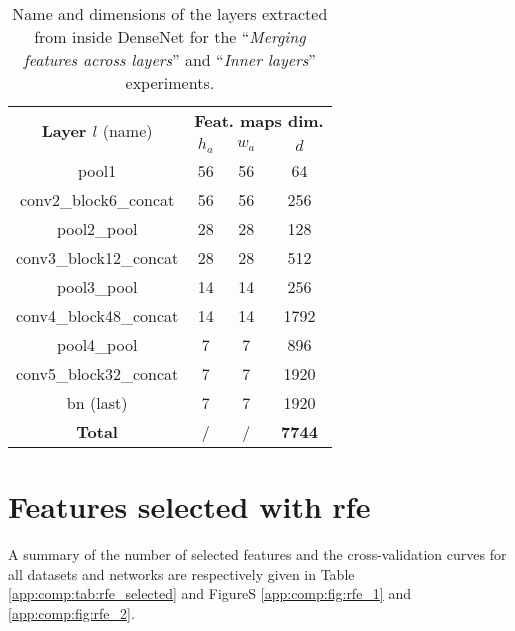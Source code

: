 \begin{table}
\centering
\begin{tabular}{|c|ccc|}
\hline
\multirow{2}{*}{\textbf{Layer $l$} (name)} & \multicolumn{3}{c|}{\textbf{Feat. maps dim.}}\\
& $h_a$ & $w_a$ & $d$ \\
\hline
pool1 & 56 & 56 & 64 \\
conv2\_block6\_concat & 56 & 56 & 256 \\
pool2\_pool & 28 & 28 & 128 \\
conv3\_block12\_concat & 28 & 28 & 512 \\
pool3\_pool & 14 & 14 & 256 \\
conv4\_block48\_concat & 14 & 14 & 1792 \\
pool4\_pool & 7 & 7 & 896 \\
conv5\_block32\_concat & 7 & 7 & 1920 \\
bn (last)& 7 & 7 & 1920 \\
\hline
\textbf{Total} & / & / & \textbf{7744} \\
\hline 
\end{tabular}
\caption{Name and dimensions of the layers extracted from inside DenseNet for the ``\textit{Merging features across layers}'' and ``\textit{Inner layers}'' experiments.}
\label{app:comp:tab:inner_layers_densenet}
\end{table}


\section{Features selected with \acrshort{rfe}}
\label{app:comp:sec:rfe_selection}
A summary of the number of selected features and the cross-validation curves for all datasets and networks are respectively given in Table \ref{app:comp:tab:rfe_selected} and FigureS \ref{app:comp:fig:rfe_1} and \ref{app:comp:fig:rfe_2}.

